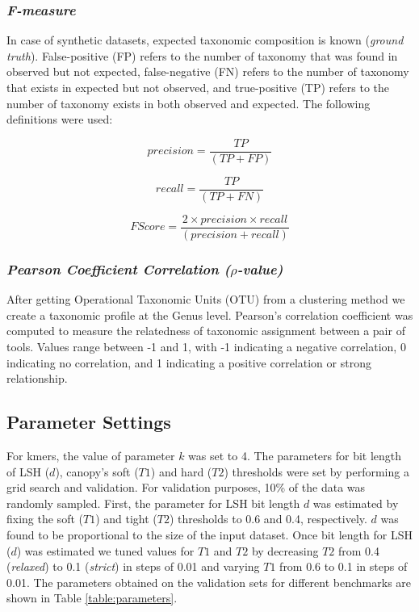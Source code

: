 \documentclass[10pt, conference, compsocconf]{IEEEtran}
\begin{document}
\subsubsection{\textit{F-measure}}
In case of synthetic datasets, expected taxonomic composition is known (\emph{ground truth}). False-positive (FP) 
refers to the number of taxonomy that was found in 
observed but not expected, false-negative (FN) refers to the number of taxonomy that exists in expected but not observed, and true-positive (TP) refers to the number of taxonomy exists in both observed and expected. The following definitions were used:

\begin{equation}
precision = \frac{TP}{(TP + FP)}
\end{equation}

\begin{equation}
recall = \frac{TP}{(TP + FN)}
\end{equation}

\begin{equation}
F Score = \frac{2 \times precision \times recall}{(precision + recall)}
\end{equation}

\subsubsection{\textit{Pearson Coefficient Correlation ($\rho$-value)}}
After getting Operational Taxonomic Units (OTU) from a clustering method we create a taxonomic profile at the Genus level. Pearson’s correlation coefficient was computed to measure the relatedness of taxonomic assignment between a pair of tools. Values range between -1 and 1, with -1 indicating a negative correlation, 0 indicating no correlation, and 1 indicating a positive correlation or strong relationship.


\subsection{\textbf{Parameter Settings}}
For kmers, the value of parameter $k$ was set to 4. The parameters for bit length of LSH ($d$), 
canopy's soft ($T1$) and 
hard ($T2$) thresholds were set by performing a grid search and validation. For validation purposes, 10\%  of the 
data was randomly sampled. First, the parameter for LSH 
bit length $d$ was estimated by fixing 
the soft ($T1$) and tight ($T2$) thresholds 
to 0.6 and 0.4, respectively.  $d$ was found to be proportional to the 
size of the input dataset. 
%
Once bit length for 
LSH  ($d$) was estimated we tuned values for $T1$ and $T2$ by decreasing $T2$ from 0.4 (\emph{relaxed}) to 0.1 (\emph{strict}) in steps of 0.01 and varying 
$T1$ from 0.6 to 0.1 in steps of 0.01. The parameters obtained on the 
validation sets for different benchmarks are 
shown in Table \ref{table:parameters}.
\end{document}
